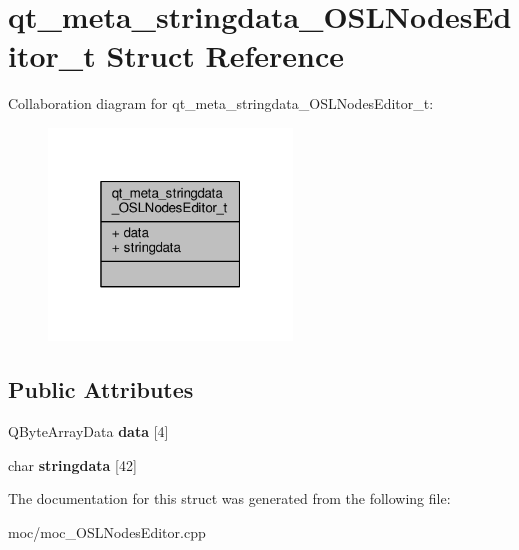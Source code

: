 \hypertarget{structqt__meta__stringdata___o_s_l_nodes_editor__t}{\section{qt\-\_\-meta\-\_\-stringdata\-\_\-\-O\-S\-L\-Nodes\-Editor\-\_\-t Struct Reference}
\label{structqt__meta__stringdata___o_s_l_nodes_editor__t}
}


Collaboration diagram for qt\-\_\-meta\-\_\-stringdata\-\_\-\-O\-S\-L\-Nodes\-Editor\-\_\-t\-:
\nopagebreak
\begin{figure}[H]
\begin{center}
\leavevmode
\includegraphics[width=184pt]{structqt__meta__stringdata___o_s_l_nodes_editor__t__coll__graph}
\end{center}
\end{figure}
\subsection*{Public Attributes}
\begin{DoxyCompactItemize}
\item 
\hypertarget{structqt__meta__stringdata___o_s_l_nodes_editor__t_ac2e15071b4c1c10bf0be7df724151ec4}{Q\-Byte\-Array\-Data {\bfseries data} \mbox{[}4\mbox{]}}\label{structqt__meta__stringdata___o_s_l_nodes_editor__t_ac2e15071b4c1c10bf0be7df724151ec4}

\item 
\hypertarget{structqt__meta__stringdata___o_s_l_nodes_editor__t_aea5bd3d349048bbdfba4f4d47fb4a10e}{char {\bfseries stringdata} \mbox{[}42\mbox{]}}\label{structqt__meta__stringdata___o_s_l_nodes_editor__t_aea5bd3d349048bbdfba4f4d47fb4a10e}

\end{DoxyCompactItemize}


The documentation for this struct was generated from the following file\-:\begin{DoxyCompactItemize}
\item 
moc/moc\-\_\-\-O\-S\-L\-Nodes\-Editor.\-cpp\end{DoxyCompactItemize}
